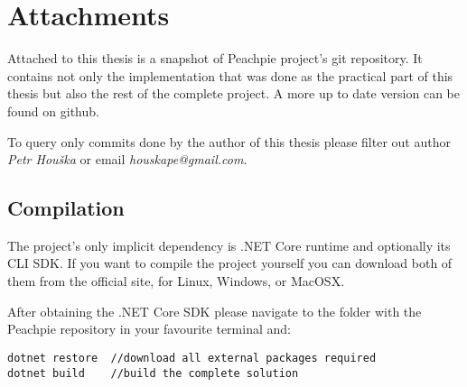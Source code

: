 \chapter{Attachments}


Attached to this thesis is a snapshot of Peachpie project’s git repository. It contains not only the implementation that was done as the practical part of this thesis but also the rest of the complete project. A more up to date version can be found on github\footnotemark.

To query only commits done by the author of this thesis please filter out author \emph{Petr Houška} or email \emph{houskape@gmail.com}.


\section{Compilation}
The project’s only implicit dependency is .NET Core runtime and optionally its CLI SDK. If you want to compile the project yourself you can download both of them from the official site\footnotemark, for Linux, Windows, or MacOSX.

After obtaining the .NET Core SDK please navigate to the folder with the Peachpie repository in your favourite terminal and:

\begin{verbatim}
dotnet restore  //download all external packages required
dotnet build    //build the complete solution
\end{verbatim}


